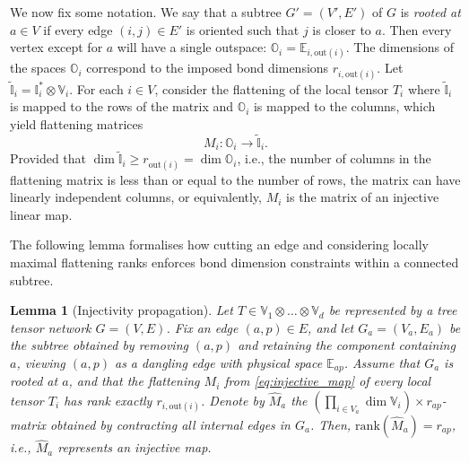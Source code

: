 \documentclass{amsart}
\theoremstyle{plain}
\newtheorem{lemma}[theorem]{Lemma}
\theoremstyle{definition}
\theoremstyle{remark}
\begin{document}
We now fix some notation. We say that a subtree $G' = (V', E')$ of $G$ is \emph{rooted at $a \in V$} if every edge $(i,j) \in E'$ is oriented such that $j$ is closer to $a$. Then every vertex except for $a$ will have a single outspace:  $\mathbb O_{i}=\mathbb E_{i, \text{out}(i)}$. The dimensions of the spaces $\mathbb O_i$ correspond to the imposed bond dimensions $r_{i, \text{out}(i)}$. 
Let $\mathbb {\widetilde I}_i=\mathbb I_i^*\otimes \mathbb V_i$. For each $i\in V$, consider the flattening of the local tensor $T_i$ where $\mathbb {\widetilde I}_i$ is mapped to the rows of the matrix and $\mathbb O_i$ is mapped to the columns, which yield flattening matrices 
\begin{equation}\label{eq:injective_map}
    M_{i}:\mathbb O_i\rightarrow \widetilde{\mathbb I}_i.
\end{equation}
Provided that $\dim \mathbb {\widetilde I}_i\ge r_{\text{out}(i)}=\dim\mathbb O_i$, i.e., the number of columns in the flattening matrix is less than or equal to the number of rows, the matrix can have linearly independent columns, or equivalently, $M_i$ is the matrix of an injective linear map.  

The following lemma formalises how cutting an edge and considering locally maximal flattening ranks enforces bond dimension constraints within a connected subtree.

\begin{lemma}[Injectivity propagation]\label{lem:edge-rank}
    Let $T\in\mathbb V_1\otimes\dots\otimes\mathbb V_d$ be represented by a tree tensor network $G=(V, E)$.  Fix an edge $(a,p)\in E$, and let $G_a=(V_a,E_a)$ be the subtree obtained by removing $(a,p)$ and retaining the component containing $a$, viewing $(a,p)$ as a dangling edge with physical space $\mathbb E_{ap}$. Assume that $G_a$ is rooted at $a$, and that the flattening $M_i$ from \eqref{eq:injective_map} of every local tensor $T_i$ has rank exactly $r_{i,\mathrm{out}(i)}$. Denote by $\widehat M_a$ the $(\prod_{i \in V_a} \dim {\mathbb V}_i ) \times r_{ap}$-matrix obtained by contracting all internal edges in $G_a$. Then, $\mathrm{rank}(\widehat M_a) = r_{ap}$, i.e., $\widehat M_a$ represents an injective map.
\end{lemma}
\end{document}
